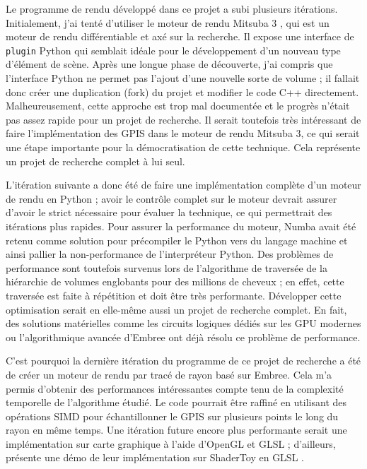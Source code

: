 Le programme de rendu développé dans ce projet \cite{felixg13gpis} a subi plusieurs itérations. Initialement, j'ai tenté d'utiliser le moteur de rendu Mitsuba 3 \cite{Mitsuba3}, qui est un moteur de rendu différentiable et axé sur la recherche. Il expose une interface de \texttt{plugin} Python qui semblait idéale pour le développement d'un nouveau type d'élément de scène. Après une longue phase de découverte, j'ai compris que l'interface Python ne permet pas l'ajout d'une nouvelle sorte de volume ; il fallait donc créer une duplication (fork) du projet et modifier le code C++ directement. Malheureusement, cette approche est trop mal documentée et le progrès n'était pas assez rapide pour un projet de recherche. Il serait toutefois très intéressant de faire l'implémentation des GPIS dans le moteur de rendu Mitsuba 3, ce qui serait une étape importante pour la démocratisation de cette technique. Cela représente un projet de recherche complet à lui seul. 

L'itération suivante a donc été de faire une implémentation complète d'un moteur de rendu en Python ; avoir le contrôle complet sur le moteur devrait assurer d'avoir le strict nécessaire pour évaluer la technique, ce qui permettrait des itérations plus rapides. Pour assurer la performance du moteur, Numba \cite{lam2015numba} avait été retenu comme solution pour précompiler le Python vers du langage machine et ainsi pallier la non-performance de l'interpréteur Python. Des problèmes de performance sont toutefois survenus lors de l'algorithme de traversée de la hiérarchie de volumes englobants pour des millions de cheveux ; en effet, cette traversée est faite à répétition et doit être très performante. Développer cette optimisation serait en elle-même aussi un projet de recherche complet. En fait, des solutions matérielles comme les circuits logiques dédiés sur les GPU modernes \cite{nvidia_rtx} ou l'algorithmique avancée d'Embree \cite{wald2014embree} ont déjà résolu ce problème de performance.

C'est pourquoi la dernière itération du programme de ce projet de recherche a été de créer un moteur de rendu par tracé de rayon basé sur Embree. Cela m'a permis d'obtenir des performances intéressantes compte tenu de la complexité temporelle de l'algorithme étudié. Le code pourrait être raffiné en utilisant des opérations SIMD pour échantillonner le GPIS sur plusieurs points le long du rayon en même temps. Une itération future encore plus performante serait une implémentation sur carte graphique à l'aide d'OpenGL et GLSL ; d'ailleurs, \textcite{xu25practical} présente une démo de leur implémentation sur ShaderToy en GLSL \cite{xu2025shadertoy}.
